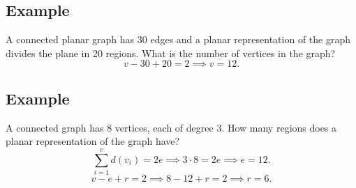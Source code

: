 \documentclass[11pt]{article}
\begin{document}
\subsection*{Example}
A connected planar graph has 30 edges and a planar representation of the graph divides the plane in 20 regions. What is the number of vertices in the graph?
\[
v - 30 + 20 = 2 \implies v = 12.
\]

\subsection*{Example}
A connected graph has 8 vertices, each of degree 3. How many regions does a planar representation of the graph have?
\[
\sum_{i = 1}^{v} d(v_i) = 2e \implies 3 \cdot 8 = 2e \implies e = 12.
\]
\[
v - e + r = 2 \implies 8 - 12 + r = 2 \implies r = 6.
\]
\end{document}
